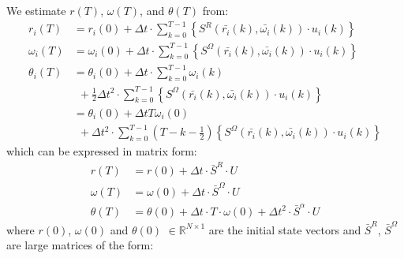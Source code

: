 \documentclass[letterpaper, 10 pt, conference]{ieeeconf}  %
\begin{document}
We estimate $r(T)$, $\omega(T)$, and $\theta(T)$ from:
\begin{subequations}
\begin{align}
r_i(T) &= r_i(0) + \Delta t \cdot \sum_{k=0}^{T-1} \left\{ S^{R} ( \bar{r_i} (k),\bar{\omega_i} (k)) \cdot u_i(k) \right\} \\
\omega_i(T) &= \omega_i(0) + \Delta t \cdot \sum_{k=0}^{T-1} \left\{ S^{\Omega} (\bar{r_i} (k),\bar{\omega_i} (k)) \cdot u_i(k) \right\} \\
\theta_i(T) &=  \theta_i(0) + \Delta t \cdot \sum_{k=0}^{T-1} \omega_i(k) \nonumber \\ 
                 & \ \ + \tfrac{1}{2} \Delta t^2 \cdot \sum_{k=0}^{T-1} \left\{ S^{\Omega} ( \bar{r_i} (k),\bar{\omega_i} (k)) \cdot u_i(k) \right\} \nonumber \\
		&=  \theta_i(0) + \Delta t T \omega_i(0) \\
		& \ \ + \Delta t^2 \cdot \sum_{k=0}^{T-1} (T-k-\tfrac{1}{2}) \left\{ S^{\Omega} ( \bar{r_i} (k),\bar{\omega_i} (k)) \cdot u_i(k) \right\} \nonumber
\end{align}
\label{eqn:linearcombinations}
\end{subequations}
which can be expressed in matrix form: 
\begin{subequations}
\begin{align}
r(T) &= r(0) + \Delta t \cdot \bar{S}^{R} \cdot U\\
\omega(T) &= \omega(0) + \Delta t \cdot \bar{S}^{\Omega} \cdot U \\
\theta(T) &=  \theta(0) + \Delta t \cdot T \cdot \omega(0) + \Delta t^2 \cdot \bar{S}^{\alpha} \cdot U
\end{align}
\end{subequations}
%
where $r(0)$, $\omega(0)$ and $\theta(0)$ $\in \mathbb{R}^{N\times 1}$ are the initial state vectors and $\bar{S}^R$, $\bar{S}^{\Omega}$ are large matrices of the form:
\end{document}

